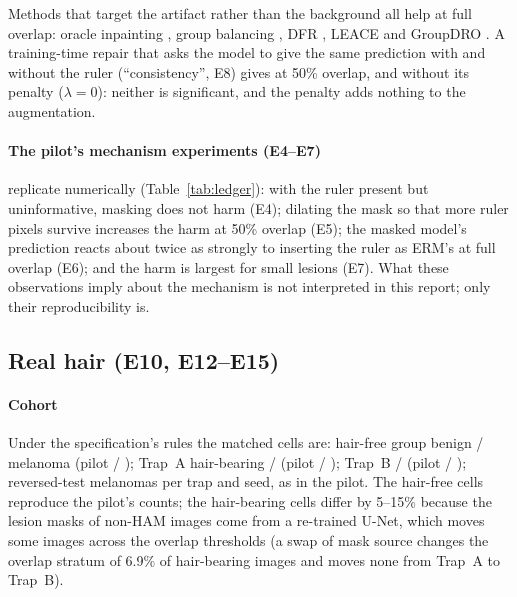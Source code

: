 Methods that target the artifact rather than the background all help at full overlap: oracle inpainting
\sOneSwinpaintOneZero, group balancing \sOneSwbalancedOneZero, DFR \sOneSwdfrOneZero, LEACE \sOneSwleaceOneZero{} and
GroupDRO \sOneSwgroupdroOneZero. A training-time repair that asks the model to give the same prediction with and
without the ruler (``consistency'', E8) gives \sOneSwinpaintconsistencyZeroFive{} at 50\% overlap, and \sOneSwinpaintconsistencylamZeroZeroFive{}
without its penalty ($\lambda=0$): neither is significant, and the penalty adds nothing to the augmentation.

\paragraph{The pilot's mechanism experiments (E4--E7)} replicate numerically (Table~\ref{tab:ledger}): with the ruler
present but uninformative, masking does not harm (E4); dilating the mask so that more ruler pixels survive increases
the harm at 50\% overlap (E5); the masked model's prediction reacts about twice as strongly to inserting the ruler as
ERM's at full overlap (E6); and the harm is largest for small lesions (E7). What these observations imply about the
mechanism is not interpreted in this report; only their reproducibility is.

\subsection{Real hair (E10, E12--E15)}
\paragraph{Cohort} Under the specification's rules the matched cells are: hair-free group \sOneCnttrapAAZeroYZero{}
benign / \sOneCnttrapAAZeroYOne{} melanoma (pilot \sOneExptrapAAZeroYZero{} / \sOneExptrapAAZeroYOne); Trap~A hair-bearing
\sOneCnttrapAAOneYZero{} / \sOneCnttrapAAOneYOne{} (pilot \sOneExptrapAAOneYZero{} / \sOneExptrapAAOneYOne); Trap~B
\sOneCnttrapBAOneYZero{} / \sOneCnttrapBAOneYOne{} (pilot \sOneExptrapBAOneYZero{} / \sOneExptrapBAOneYOne); \sOneRevMeltrapA{}
reversed-test melanomas per trap and seed, as in the pilot. The hair-free cells reproduce the pilot's counts; the
hair-bearing cells differ by 5--15\% because the lesion masks of non-HAM images come from a re-trained U-Net, which
moves some images across the overlap thresholds (a swap of mask source changes the overlap stratum of 6.9\% of
hair-bearing images and moves none from Trap~A to Trap~B).

